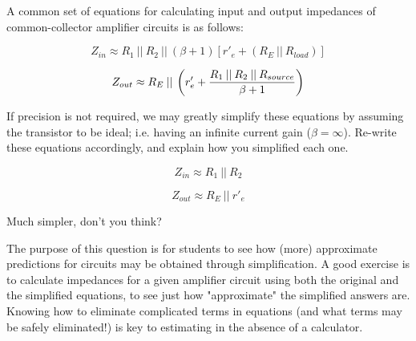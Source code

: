 

A common set of equations for calculating input and output impedances of common-collector amplifier circuits is as follows:

$$Z_{in} \approx R_1 \> || \> R_2 \> || \> (\beta + 1)[r'_e + (R_E \> || \> R_{load})]$$

$$Z_{out} \approx R_E \> || \> \left( r'_e + {{R_1 \> || \> R_2 \> || \> R_{source}} \over {\beta + 1}} \right) $$

If precision is not required, we may greatly simplify these equations by assuming the transistor to be ideal; i.e. having an infinite current gain ($\beta = \infty$).  Re-write these equations accordingly, and explain how you simplified each one.







$$Z_{in} \approx R_1 \> || \> R_2$$

$$Z_{out} \approx R_E \> || \> r'_e$$

Much simpler, don't you think?







The purpose of this question is for students to see how (more) approximate predictions for circuits may be obtained through simplification.  A good exercise is to calculate impedances for a given amplifier circuit using both the original and the simplified equations, to see just how "approximate" the simplified answers are.  Knowing how to eliminate complicated terms in equations (and what terms may be safely eliminated!) is key to estimating in the absence of a calculator.




